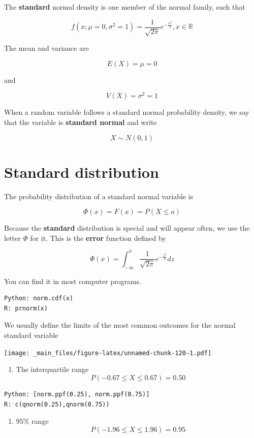\documentclass[
]{book}
\providecommand{\tightlist}{%
  \setlength{\itemsep}{0pt}\setlength{\parskip}{0pt}}
\begin{document}
The \textbf{standard} normal density is one member of the normal family, such that

\[f(x; \mu=0, \sigma^2=1)=\frac{1}{\sqrt{2\pi}}e^{-\frac{x^2}{2}}, x \in {\mathbb R}\]

The mean and variance are

\[E (X)= \mu = 0\]

and

\[V (X)=  \sigma^2 =1\]

When a random variable follows a standard normal probability density, we say that the variable is \textbf{standard normal} and write

\[X \sim N(0,1)\]

\hypertarget{standard-distribution}{%
\section{Standard distribution}\label{standard-distribution}}

The probability distribution of a standard normal variable is

\[\Phi(x)=F(x)=P(X \leq a)\]

Because the \textbf{standard} distribution is special and will appear often, we use the letter \(\Phi\) for it. This is the \textbf{error} function defined by

\[\Phi(x)=\int_{-\infty}^{x} \frac{1}{\sqrt{2\pi}}e^{-\frac{z^2}{2}} dz\]

You can find it in most computer programs.

\begin{verbatim}
Python: norm.cdf(x)
R: prnorm(x)
\end{verbatim}

We usually define the limits of the most common outcomes for the normal standard variable

\texttt{[image: \_main\_files/figure-latex/unnamed-chunk-120-1.pdf]}

\begin{enumerate}
\def\labelenumi{\arabic{enumi})}
\tightlist
\item
  The interquartile range \[P(-0.67 \leq X \leq 0.67)=0.50\]
\end{enumerate}

\begin{verbatim}
Python: [norm.ppf(0.25), norm.ppf(0.75)]
R: c(qnorm(0.25),qnorm(0.75))
\end{verbatim}

\begin{enumerate}
\def\labelenumi{\arabic{enumi})}
\setcounter{enumi}{1}
\tightlist
\item
  \(95\%\) range \[P(-1.96 \leq X \leq 1.96)=0.95\]
\end{enumerate}
\end{document}
